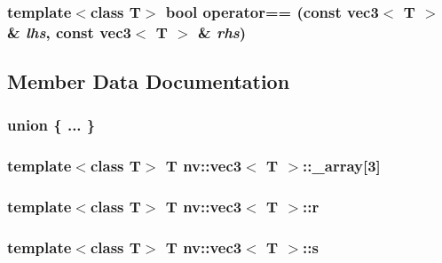 \hypertarget{classnv_1_1vec3_0cada26488c14237f5e3cad4bcf16ab9}{
\subsubsection[{operator==}]{\setlength{\rightskip}{0pt plus 5cm}template$<$class T$>$ bool operator== (const {\bf vec3}$<$ T $>$ \& {\em lhs}, \/  const {\bf vec3}$<$ T $>$ \& {\em rhs})}}
\label{classnv_1_1vec3_0cada26488c14237f5e3cad4bcf16ab9}




\subsection{Member Data Documentation}
\hypertarget{classnv_1_1vec3_11219b9855afe7e33dbd23e4f45bacae}{
\subsubsection[{"@13}]{\setlength{\rightskip}{0pt plus 5cm}union \{ ... \} }}
\label{classnv_1_1vec3_11219b9855afe7e33dbd23e4f45bacae}


\hypertarget{classnv_1_1vec3_526c6e0da95f6c87cd95bd28c40ee457}{
\subsubsection[{\_\-array}]{\setlength{\rightskip}{0pt plus 5cm}template$<$class T$>$ T {\bf nv::vec3}$<$ T $>$::{\bf \_\-array}\mbox{[}3\mbox{]}}}
\label{classnv_1_1vec3_526c6e0da95f6c87cd95bd28c40ee457}


\hypertarget{classnv_1_1vec3_806f03c9db7ec5435c1ba227be78e39e}{
\subsubsection[{r}]{\setlength{\rightskip}{0pt plus 5cm}template$<$class T$>$ T {\bf nv::vec3}$<$ T $>$::{\bf r}}}
\label{classnv_1_1vec3_806f03c9db7ec5435c1ba227be78e39e}


\hypertarget{classnv_1_1vec3_a8acdad61c300d347acc1e6cc0f6a2ba}{
\subsubsection[{s}]{\setlength{\rightskip}{0pt plus 5cm}template$<$class T$>$ T {\bf nv::vec3}$<$ T $>$::{\bf s}}}
\label{classnv_1_1vec3_a8acdad61c300d347acc1e6cc0f6a2ba}


